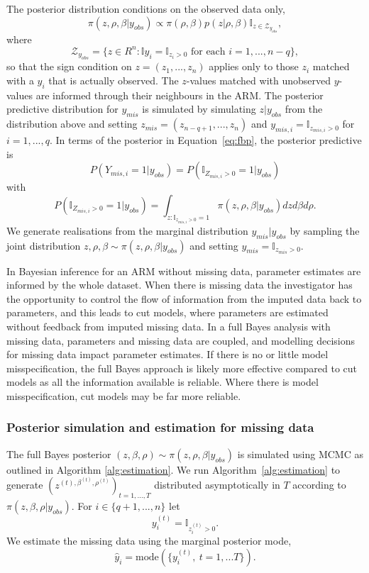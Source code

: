 \documentclass{article}
\begin{document}
The posterior distribution conditions on the observed data only,
\begin{equation}\label{eq:fbp}
\pi (z, \rho, \beta | y_{obs} ) \propto \pi (\rho, \beta) p(z | \rho, \beta)\mathbb{I}_{z\in \mathcal{Z}_{y_{obs}}},
\end{equation}
where
\[
\mathcal{Z}_{y_{obs}}=\{z\in R^n: \mathbb{I} y_i = \mathbb{I}_{z_i > 0} \mbox{\ for each\ } i=1,...,n-q\},
\]
so that the sign condition on $z=(z_1,...,z_n)$ applies only to those $z_i$ matched with a $y_i$ that is actually observed.
The $z$-values matched with unobserved $y$-values are informed through their neighbours in the ARM.
The posterior predictive distribution for $y_{mis}$ is
simulated by simulating $z|y_{obs}$ from the distribution above
and setting $z_{mis}=(z_{n-q+1},...,z_n)$ and $y_{mis,i}=\mathbb{I}_{z_{mis,i}>0}$ for $i=1,...,q$.
In terms of the posterior in Equation~\ref{eq:fbp}, the posterior predictive is
\begin{equation}\label{eq:p1}
P(Y_{mis,i}=1|y_{obs})=P(\mathbb{I}_{Z_{mis,i} > 0}=1|y_{obs})
\end{equation}
with
\[
P(\mathbb{I}_{Z_{mis,i} > 0}=1|y_{obs})=\int_{z: \mathbb{I}_{z_{mis,i} > 0}=1}\pi (z, \rho, \beta | y_{obs} )dz d\beta d\rho.
\]
We generate realisations from the marginal distribution $y_{mis}|y_{obs}$ by sampling the joint distribution
$z,\rho,\beta \sim \pi(z, \rho, \beta | y_{obs} )$ and setting $y_{mis}=\mathbb{I}_{z_{mis}>0}$.
	
In Bayesian inference for an ARM without missing data, parameter estimates are informed by the whole dataset. When there is missing data
the investigator has the opportunity to control the flow of information from the imputed data back to parameters, and this leads to cut models,
where parameters are estimated without feedback from imputed missing data.
In a full Bayes analysis with missing data, parameters and missing data are coupled, and modelling decisions for missing data impact parameter estimates.
If there is no or little model misspecification, the full Bayes approach is likely more effective compared to cut models as all the information available is reliable.
Where there is model misspecification, cut models may be far more reliable.

\subsubsection{Posterior simulation and estimation for missing data}\label{sec:FBest}
The full Bayes posterior $(z,\beta,\rho)\sim \pi (z, \rho, \beta | y_{obs} ) $
is simulated using MCMC as outlined in Algorithm \ref{alg:estimation}.
We run Algorithm~\ref{alg:estimation} to generate $(z^{(t),\beta^{(t)},\rho^{(t)}})_{t=1,...,T}$ distributed asymptotically in $T$ according to $\pi (z, \beta, \rho | y_{obs} )$.
For $i\in \{q+1,...,n\}$ let
\begin{equation}\label{eq:defy}
y^{(t)}_i=\mathbb{I}_{z^{(t)}_i>0}.
\end{equation}
We estimate the missing data using the marginal posterior mode,
\begin{equation}\label{eq:defyhat}
\hat y_i=\mbox{mode}(\{y^{(t)}_i,\ {t=1,...T}\}).
\end{equation}
\end{document}
